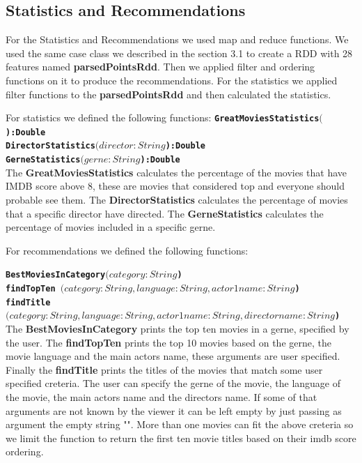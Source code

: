 \documentclass[letterpaper,twocolumn,10pt]{article}
\begin{document}
\subsection{Statistics and Recommendations}

For the Statistics and Recommendations we used map and reduce functions. We used the same case class we described in the section 3.1 to create a RDD with 28 features named \textbf{parsedPointsRdd}. Then we applied filter and ordering functions on it to produce the recommendations. For the statistics we applied filter functions to the \textbf{parsedPointsRdd} and then calculated the statistics. \par 

For statistics we defined the following functions:
\noindent
{\bf \tt GreatMoviesStatistics\((\)):Double } \\ 

\noindent
{\bf \tt DirectorStatistics\((director:String\)):Double } \\ 

\noindent
{\bf \tt GerneStatistics\((gerne:String\)):Double } \\ 

The \textbf{GreatMoviesStatistics} calculates the percentage of the movies that have IMDB score above 8, these are movies that considered top and everyone should probable see them. The \textbf{DirectorStatistics} calculates the percentage of movies that a specific director have directed. The \textbf{GerneStatistics} calculates the percentage of movies included in a specific gerne. \par


For recommendations we defined the following functions:

\noindent
{\bf \tt BestMoviesInCategory\((category:String\)) } \\

\noindent
{\bf \tt findTopTen  \((category:String,language:String,actor1name:String\)) } \\

\noindent
{\bf \tt findTitle\((category:String, language:String, actor1name:String, directorname:String\)) } \\

The \textbf{BestMoviesInCategory} prints the top ten movies in a gerne, specified by the user. The \textbf{findTopTen} prints the top 10 movies based on the gerne, the movie language and the main actors name, these arguments are user specified. Finally the \textbf{findTitle} prints the titles of the movies that match some user specified creteria. The user can specify the gerne of the movie, the language of the movie, the main actors name and the directors name. If some of that arguments are not known  by the viewer it can be left empty by just passing as argument the empty string "". More than one movies can fit the above creteria so we limit the function to return the first ten movie titles based on their imdb score ordering. \par
\end{document}
